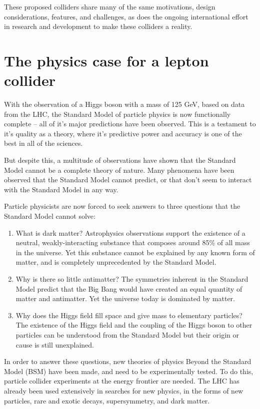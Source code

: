 These proposed colliders share many of the same motivations, design considerations, features, and challenges, as does the ongoing international effort in research and development to make these colliders a reality.

\section{The physics case for a lepton collider}
With the observation of a Higgs boson with a mass of 125 GeV, based on data from the \acrlong{LHC}, the Standard Model of particle physics is now functionally complete -- all of it's major predictions have been observed. This is a testament to it's quality as a theory, where it's predictive power and accuracy is one of the best in all of the sciences.

But despite this, a multitude of observations have shown that the Standard Model cannot be a complete theory of nature. Many phenomena have been observed that the Standard Model cannot predict, or that don't seem to interact with the Standard Model in any way.

Particle physicists are now forced to seek answers to three questions that the Standard Model cannot solve:

\begin{enumerate}
	\item What is dark matter? Astrophysics observations support the existence of a neutral, weakly-interacting substance that composes around 85\% of all mass in the universe. Yet this substance cannot be explained by any known form of matter, and is completely unprecedented by the Standard Model.
	\item Why is there so little antimatter? The symmetries inherent in the Standard Model predict that the Big Bang would have created an equal quantity of matter and antimatter. Yet the universe today is dominated by matter.
	\item Why does the Higgs field fill space and give mass to elementary particles? The existence of the Higgs field and the coupling of the Higgs boson to other particles can be understood from the Standard Model but their origin or cause is still unexplained.
\end{enumerate}

In order to answer these questions, new theories of physics Beyond the Standard Model (\acrshort{BSM}) have been made, and need to be experimentally tested. To do this, particle collider experiments at the energy frontier are needed. The \acrfull{LHC} has already been used extensively in searches for new physics, in the forms of new particles, rare and exotic decays, supersymmetry, and dark matter.

